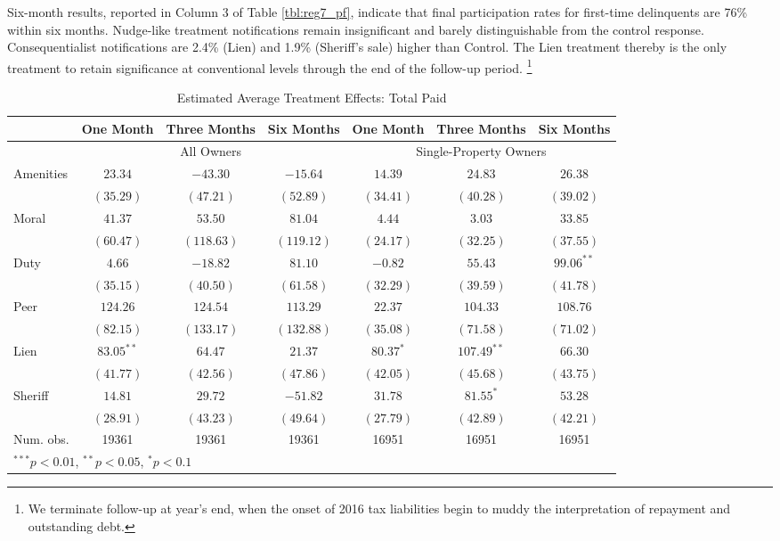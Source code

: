 \documentclass[12pt,titlepage]{article}
\begin{document}
Six-month results, reported in Column 3 of Table \ref{tbl:reg7_pf}, indicate that final 
participation rates for first-time delinquents are 76\% within six months. 
Nudge-like treatment notifications remain insignificant and barely 
distinguishable from the control response. Consequentialist notifications 
are 2.4\% (Lien) and 1.9\% (Sheriff's sale) higher than Control. The Lien treatment 
thereby is the only treatment to retain significance at conventional 
levels through the end of the follow-up period.
\footnote{
	We terminate follow-up at year's end, when the onset of 2016 tax liabilities 
	begin to muddy the interpretation of repayment and outstanding debt.
}

\begin{sidewaystable}[htbp]
\caption{Estimated Average Treatment Effects: Total Paid}
\begin{center}
\begin{tabular}{|l| c c c| c c c| }
\hline
          & One Month & Three Months & Six Months & One Month & Three Months & Six Months \\
\hline
 & \multicolumn{3}{c}{All Owners} & \multicolumn{3}{|c|}{Single-Property Owners} \\
Amenities & $23.34$      & $-43.30$   & $-15.64$   & $14.39$     & $24.83$       & $26.38$      \\
          & $(35.29)$    & $(47.21)$  & $(52.89)$  & $(34.41)$   & $(40.28)$     & $(39.02)$    \\
Moral     & $41.37$      & $53.50$    & $81.04$    & $4.44$      & $3.03$        & $33.85$      \\
          & $(60.47)$    & $(118.63)$ & $(119.12)$ & $(24.17)$   & $(32.25)$     & $(37.55)$    \\
Duty      & $4.66$       & $-18.82$   & $81.10$    & $-0.82$     & $55.43$       & $99.06^{**}$ \\
          & $(35.15)$    & $(40.50)$  & $(61.58)$  & $(32.29)$   & $(39.59)$     & $(41.78)$    \\
Peer      & $124.26$     & $124.54$   & $113.29$   & $22.37$     & $104.33$      & $108.76$     \\
          & $(82.15)$    & $(133.17)$ & $(132.88)$ & $(35.08)$   & $(71.58)$     & $(71.02)$    \\
Lien      & $83.05^{**}$ & $64.47$    & $21.37$    & $80.37^{*}$ & $107.49^{**}$ & $66.30$      \\
          & $(41.77)$    & $(42.56)$  & $(47.86)$  & $(42.05)$   & $(45.68)$     & $(43.75)$    \\
Sheriff   & $14.81$      & $29.72$    & $-51.82$   & $31.78$     & $81.55^{*}$   & $53.28$      \\
          & $(28.91)$    & $(43.23)$  & $(49.64)$  & $(27.79)$   & $(42.89)$     & $(42.21)$    \\
\hline
Num. obs. & 19361        & 19361      & 19361      & 16951       & 16951         & 16951        \\
\hline
\multicolumn{7}{l}{\scriptsize{$^{***}p<0.01$, $^{**}p<0.05$, $^*p<0.1$}}
\end{tabular}
\label{tbl:reg7_tp}
\end{center}
\end{sidewaystable}
\end{document}
